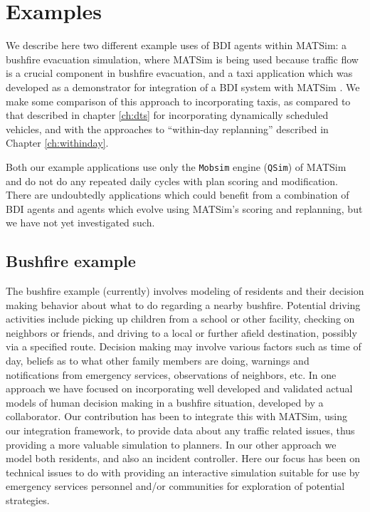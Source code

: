 \section{Examples}
\label{sec:bid-examples}
We describe here two different example uses of BDI agents within
MATSim: a bushfire evacuation simulation, where MATSim is
being used because traffic flow is a crucial component in bushfire
evacuation, and a taxi application which was developed as a
demonstrator for integration of a BDI system with MATSim \cite{ecai}. We make
some comparison of this approach to incorporating taxis, as compared to
that described in chapter \ref{ch:dts} for
incorporating dynamically scheduled vehicles, and with the approaches
to ``within-day replanning'' described in Chapter \ref{ch:withinday}.

%
Both our example applications use only the \texttt{Mobsim} engine
(\texttt{QSim}) of MATSim and do not do any repeated daily cycles
with plan scoring and modification. There are undoubtedly applications which
could benefit from a combination of BDI agents and agents which evolve using
MATSim's scoring and replanning, but we have not yet investigated such.

\subsection{Bushfire example}
The bushfire example (currently) involves modeling of residents and
their decision making behavior about what to do regarding a nearby
bushfire. Potential driving activities include picking up children
from a school or other facility, checking on neighbors or friends,
and driving to a local or further afield destination, possibly via a
specified route. Decision making may involve various factors such as
time of day, beliefs as to what other family members are doing,
warnings and notifications from emergency services, observations of
neighbors, etc. In one approach we have focused on incorporating
well developed and validated actual models of human decision making in
a bushfire situation, developed by a collaborator. Our contribution
has been to integrate this with MATSim, using our integration
framework, to provide data about any traffic related issues, thus
providing a more valuable simulation to planners. In our other
approach we model both residents, and also an incident
controller. Here our focus has been on technical issues to do with
providing an interactive simulation suitable for use by emergency
services personnel and/or communities for exploration of potential
strategies. 

